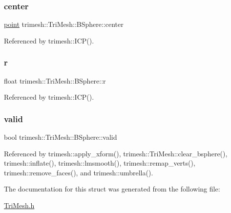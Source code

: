 \subsubsection{\texorpdfstring{center}{center}}
{\footnotesize\ttfamily \hyperlink{namespacetrimesh_a325b99fd6454b22fa4c4bc3223271b2c}{point} trimesh\+::\+Tri\+Mesh\+::\+B\+Sphere\+::center}



Referenced by trimesh\+::\+I\+C\+P().

\mbox{\label{structtrimesh_1_1TriMesh_1_1BSphere_a9d06cee2284cf345cd9945d9c5117168}} 
\subsubsection{\texorpdfstring{r}{r}}
{\footnotesize\ttfamily float trimesh\+::\+Tri\+Mesh\+::\+B\+Sphere\+::r}



Referenced by trimesh\+::\+I\+C\+P().

\mbox{\label{structtrimesh_1_1TriMesh_1_1BSphere_a760a7c7c03f40f660e11d6b9b4bb4183}} 
\subsubsection{\texorpdfstring{valid}{valid}}
{\footnotesize\ttfamily bool trimesh\+::\+Tri\+Mesh\+::\+B\+Sphere\+::valid}



Referenced by trimesh\+::apply\+\_\+xform(), trimesh\+::\+Tri\+Mesh\+::clear\+\_\+bsphere(), trimesh\+::inflate(), trimesh\+::lmsmooth(), trimesh\+::remap\+\_\+verts(), trimesh\+::remove\+\_\+faces(), and trimesh\+::umbrella().



The documentation for this struct was generated from the following file\+:\begin{DoxyCompactItemize}
\item 
\hyperlink{TriMesh_8h}{Tri\+Mesh.\+h}\end{DoxyCompactItemize}
